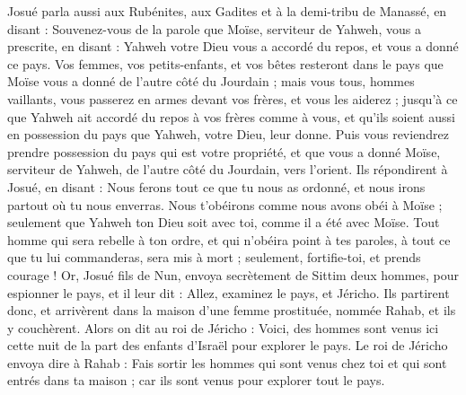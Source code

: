 \begin{multicols}{2}
Josué parla aussi aux Rubénites, aux Gadites et à la demi-tribu de Manassé, en disant :
Souvenez-vous de la parole que Moïse, serviteur de Yahweh, vous a prescrite, en disant : Yahweh votre Dieu vous a accordé du repos, et vous a donné ce pays.
Vos femmes, vos petits-enfants, et vos bêtes resteront dans le pays que Moïse vous a donné de l’autre côté du Jourdain ; mais vous tous, hommes vaillants, vous passerez en armes devant vos frères, et vous les aiderez ;
jusqu’à ce que Yahweh ait accordé du repos à vos frères comme à vous, et qu’ils soient aussi en possession du pays que Yahweh, votre Dieu, leur donne. Puis vous reviendrez prendre possession du pays qui est votre propriété, et que vous a donné Moïse, serviteur de Yahweh, de l’autre côté du Jourdain, vers l’orient.
Ils répondirent à Josué, en disant : Nous ferons tout ce que tu nous as ordonné, et nous irons partout où tu nous enverras.
Nous t’obéirons comme nous avons obéi à Moïse ; seulement que Yahweh ton Dieu soit avec toi, comme il a été avec Moïse.
Tout homme qui sera rebelle à ton ordre, et qui n’obéira point à tes paroles, à tout ce que tu lui commanderas, sera mis à mort ; seulement, fortifie-toi, et prends courage !
\VerseOne{}Or, Josué fils de Nun, envoya secrètement de Sittim deux hommes, pour espionner le pays, et il leur dit : Allez, examinez le pays, et Jéricho. Ils partirent donc, et arrivèrent dans la maison d’une femme prostituée, nommée Rahab, et ils y couchèrent.
Alors on dit au roi de Jéricho : Voici, des hommes sont venus ici cette nuit de la part des enfants d’Israël pour explorer le pays.
Le roi de Jéricho envoya dire à Rahab : Fais sortir les hommes qui sont venus chez toi et qui sont entrés dans ta maison ; car ils sont venus pour explorer tout le pays.

\end{multicols}
